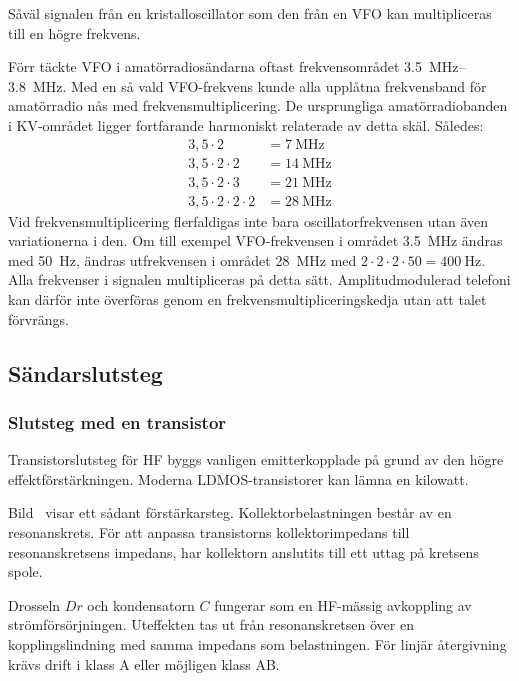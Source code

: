 Såväl signalen från en kristalloscillator som den från en VFO kan
multipliceras till en högre frekvens.

Förr täckte VFO i amatörradiosändarna oftast frekvensområdet
\SIrange{3,5}{3,8}{\mega\hertz}.
Med en så vald VFO-frekvens kunde alla upplåtna frekvensband för
amatörradio nås med frekvensmultiplicering.
De ursprungliga amatörradiobanden i KV-området ligger fortfarande harmoniskt
relaterade av detta skäl. Således:
\begin{align*}
  3,5 \cdot 2 & = \qty{7}{\mega\hertz} \\
  3,5 \cdot 2 \cdot 2 & = \qty{14}{\mega\hertz} \\
  3,5 \cdot 2 \cdot 3 & = \qty{21}{\mega\hertz} \\
  3,5 \cdot 2 \cdot 2 \cdot 2 & = \qty{28}{\mega\hertz}
\end{align*}
Vid frekvensmultiplicering flerfaldigas inte bara oscillatorfrekvensen utan
även variationerna i den.
Om till exempel VFO-frekvensen i området \qty{3,5}{\mega\hertz} ändras med
\qty{50}{\hertz}, ändras utfrekvensen i området \qty{28}{\mega\hertz} med
\(2 \cdot 2 \cdot 2 \cdot 50 = \qty{400}{\hertz}\).
Alla frekvenser i signalen multipliceras på detta sätt.
Amplitudmodulerad telefoni kan därför inte överföras genom en
frekvensmultipliceringskedja utan att talet förvrängs.

\subsection{Sändarslutsteg}

\subsubsection{Slutsteg med en transistor}


Transistorslutsteg för HF byggs vanligen emitterkopplade på grund av den
högre effektförstärkningen.
Moderna LDMOS-transistorer kan lämna en kilowatt.

Bild~ visar ett sådant förstärkarsteg.
Kollektorbelastningen består av en resonanskrets.
För att anpassa transistorns kollektorimpedans till resonanskretsens
impedans, har kollektorn anslutits till ett uttag på kretsens spole.

Drosseln \(Dr\) och kondensatorn \(C\) fungerar som en HF-mässig avkoppling av
strömförsörjningen.
Uteffekten tas ut från resonanskretsen över en kopplingslindning med samma
impedans som belastningen.
För linjär återgivning krävs drift i klass A eller möjligen klass AB.

